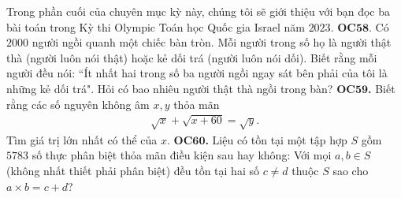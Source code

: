 \begin{multicols}{2}
	\vskip 0.1cm
	Trong phần cuối của chuyên mục kỳ này, chúng tôi sẽ giới thiệu với bạn đọc ba bài toán trong Kỳ thi Olympic Toán học Quốc gia Israel năm $2023$.
	\vskip 0.1cm
	{\bf\color{cackithi} OC$\pmb{58.}$} Có $2000$ người ngồi quanh một chiếc bàn tròn. Mỗi người trong số họ là người  thật thà (người luôn nói thật) hoặc kẻ  dối trá (người luôn nói dối). Biết rằng mỗi người đều nói: ``Ít nhất hai trong số ba người ngồi ngay sát bên phải của tôi là những kẻ dối trá". Hỏi có bao nhiêu người thật thà ngồi trong bàn?
	\vskip 0.1cm
	{\bf\color{cackithi} OC$\pmb{59}$.} Biết rằng các số nguyên không âm $x,y$ thỏa mãn
	\begin{align*}
		\sqrt{x}+\sqrt{x+60}=\sqrt{y}.
	\end{align*}
	Tìm giá trị lớn nhất có thể của $x$.
	\vskip 0.1cm
	{\bf\color{cackithi} OC$\pmb{60}$.} Liệu có tồn tại một tập hợp $S$ gồm $5783$ số thực phân biệt thỏa mãn điều kiện sau hay không:
	Với mọi $a,b\in S$ (không nhất thiết phải phân biệt) đều tồn tại hai số $c\neq d$ thuộc $S$ sao cho $a \times b=c+d$?
\end{multicols}